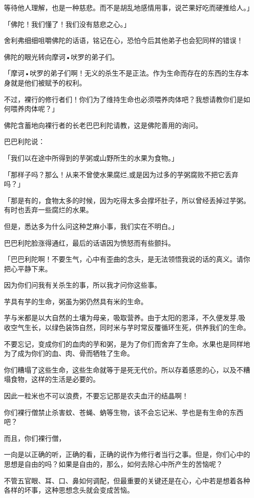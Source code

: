 \documentclass[twoside,openany]{book}
\begin{document}
等待他人理解，也是一种慈悲。而不是胡乱地感情用事，说芒果好吃而硬推给人。」

「佛陀！我们懂了！我们没有慈悲之心。」

舍利弗细细咀嚼佛陀的话语，铭记在心，恐怕今后其他弟子也会犯同样的错误！

佛陀的眼光转向摩诃•吠罗的弟子们。

「摩诃•吠罗的弟子们啊！无义的杀生不是正法。作为生命而存在的东西的生存本身就是他们被赋予的权利。

不过，裸行的修行者们！你们为了维持生命也必须喂养肉体吧？我想请教你们是如何喂养肉体呢？」

佛陀含蓄地向裸行者的长老巴巴利陀请教，这是佛陀善用的询问。

巴巴利陀说：

「我们以在途中所得到的芋粥或山野所生的水果为食物。」

「那样子吗？那么！从来不曾使水果腐烂,或是因为过多的芋粥腐败不把它丢弃吗？」

「那是有的，食物太多的时候，因为吃得太多会撑坏肚子，所以曾经丢掉过芋粥。有时也丢弃一些腐烂的水果。

但是，悉达多为什么问这种芝麻小事，我们实在不明白。」

巴巴利陀脸涨得通红，最后的话语因为愤怒而有些颤抖。

「巴巴利陀啊！不要生气，心中有歪曲的念头，是无法领悟我说的话的真义。请你把心平静下来。

因为你们问我有关杀生的事，所以我才问你这些事。

芋具有芋的生命，粥虽为粥仍然具有米的生命。

芋与米都是以大自然的土壤为母亲，吸取营养。由于太阳的恩泽，不久便发芽,吸收空气生长，以绿色装饰自然，同时米与芋时常反覆循环生死，供养我们的生命。

不要忘记，变成你们的血肉的芋和粥，是为了你们而舍弃了生命。水果也是同样地为了成为你们的血、肉、骨而牺牲了生命。

你们糟塌了这些生命，这些生命就等于是死无代价。所以存着感恩的心，以及不糟塌食物，这样的生活是必要的。

因此一粒米也不可以浪费，不要忘记那是农夫血汗的结晶啊！

你们裸行僧禁止杀害蚊、苍蝇、蚋等生物，该不会忘记米、芋也是有生命的东西吧？

而且，你们裸行僧，

一向是以正确的听，正确的看，正确的说作为修行者当行之事。但是，你们心中的思想是自由的吗？如果是自由的，那么，如何去除心中所产生的苦恼呢？

不管五官眼、耳、口、鼻如何调配，但最重要的关键还是在心，心中若是想着各种各样的坏事，这种思想念头就会变成苦恼。
\end{document}
